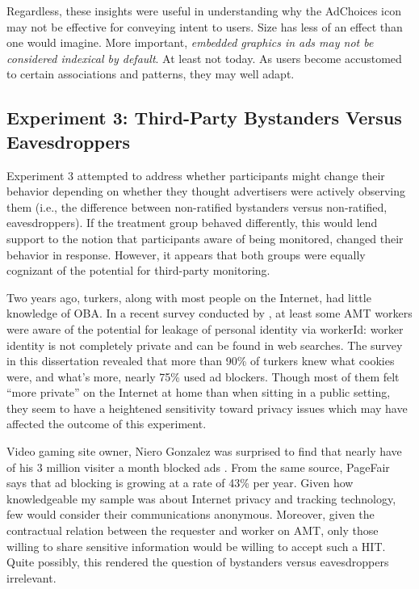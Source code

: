 Regardless, these insights were useful in understanding why the AdChoices icon may not be effective for conveying intent to users. Size has less of an effect than one would imagine. More important, \emph{embedded graphics in ads may not be considered indexical by default}. At least not today. As users become accustomed to certain associations and patterns, they may well adapt.

\subsection{Experiment 3: Third-Party Bystanders Versus Eavesdroppers}
\label{experiment3:third-partybystandersversuseavesdroppers}

Experiment 3 attempted to address whether participants might change their behavior depending on whether they thought advertisers were actively observing them (i.e., the difference between non-ratified bystanders versus non-ratified, eavesdroppers). If the treatment group behaved differently, this would lend support to the notion that participants aware of being monitored, changed their behavior in response. However, it appears that both groups were equally cognizant of the potential for third-party monitoring. 

Two years ago, turkers, along with most people on the Internet, had little knowledge of OBA. In a recent survey conducted by  \citet{Lease:2013vq},  at least some AMT workers were aware of the potential for leakage of personal identity via workerId: worker identity is not completely private and can be found in web searches. The survey in this dissertation revealed that more than 90\% of turkers knew what cookies were, and what's more, nearly 75\% used ad blockers. Though most of them felt ``more private'' on the Internet at home than when sitting in a public setting, they seem to have a heightened sensitivity toward privacy issues which may have affected the outcome of this experiment.

Video gaming site owner, Niero Gonzalez was surprised to find that nearly have of his 3 million visiter a month blocked ads  \citep{Hill:2013wp}.  From the same source, PageFair says that ad blocking is growing at a rate of 43\% per year. Given how knowledgeable my sample was about Internet privacy and tracking technology, few would consider their communications anonymous. Moreover, given the contractual relation between the requester and worker on AMT, only those willing to share sensitive information would be willing to accept such a HIT. Quite possibly, this rendered the question of bystanders versus eavesdroppers irrelevant.

